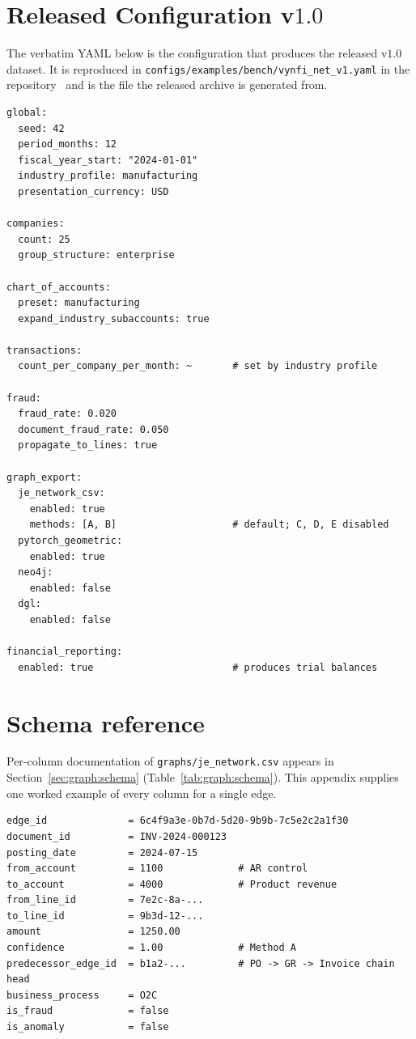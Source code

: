 \section{Released Configuration v$1.0$}
\label{sec:appendix:config}

The verbatim YAML below is the configuration that produces the
released v$1.0$ \bench{} dataset.  It is reproduced in
\texttt{configs/examples/bench/vynfi\_net\_v1.yaml} in the
\system{} repository~\citep{datasynth-repo} and is the file the
released archive is generated from.

\begin{lstlisting}[language={},basicstyle=\ttfamily\footnotesize,
                   caption={Released configuration v$1.0$ (excerpt).
                            Full file in
                            \texttt{configs/examples/bench/vynfi\_net\_v1.yaml}.}]
global:
  seed: 42
  period_months: 12
  fiscal_year_start: "2024-01-01"
  industry_profile: manufacturing
  presentation_currency: USD

companies:
  count: 25
  group_structure: enterprise

chart_of_accounts:
  preset: manufacturing
  expand_industry_subaccounts: true

transactions:
  count_per_company_per_month: ~       # set by industry profile

fraud:
  fraud_rate: 0.020
  document_fraud_rate: 0.050
  propagate_to_lines: true

graph_export:
  je_network_csv:
    enabled: true
    methods: [A, B]                    # default; C, D, E disabled
  pytorch_geometric:
    enabled: true
  neo4j:
    enabled: false
  dgl:
    enabled: false

financial_reporting:
  enabled: true                        # produces trial balances
\end{lstlisting}

\section{Schema reference}
\label{sec:appendix:schema}

Per-column documentation of \texttt{graphs/je\_network.csv} appears
in Section~\ref{sec:graph:schema} (Table~\ref{tab:graph:schema}).
This appendix supplies one worked example of every column for a
single edge.

\begin{lstlisting}[language={},basicstyle=\ttfamily\footnotesize,
                   caption={Example row of \texttt{graphs/je\_network.csv}.}]
edge_id              = 6c4f9a3e-0b7d-5d20-9b9b-7c5e2c2a1f30
document_id          = INV-2024-000123
posting_date         = 2024-07-15
from_account         = 1100             # AR control
to_account           = 4000             # Product revenue
from_line_id         = 7e2c-8a-...
to_line_id           = 9b3d-12-...
amount               = 1250.00
confidence           = 1.00             # Method A
predecessor_edge_id  = b1a2-...         # PO -> GR -> Invoice chain head
business_process     = O2C
is_fraud             = false
is_anomaly           = false
\end{lstlisting}


